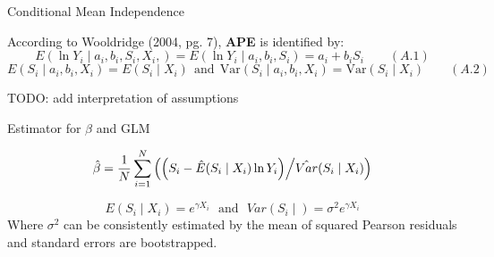 \documentclass[10pt,ignorenonframetext,]{beamer}
\begin{document}
\begin{frame}{Conditional Mean Independence}
\protect\hypertarget{conditional-mean-independence}{}

According to Wooldridge (2004, pg. 7), \textbf{APE} is identified by:
\[E (\ln Y_i \mid a_i, b_i, S_i, X_i,) = E (\ln Y_i \mid a_i, b_i, S_i) = a_i+b_i S_i \qquad (A.1)\]
\[E(S_i \mid a_i, b_i, X_i) = E(S_i \mid X_i) ~~\text{and}~~ \mathrm{Var}(S_i \mid 
a_i, b_i, X_i) = \mathrm{Var} (S_i \mid X_i) \qquad (A.2)\]

TODO: add interpretation of assumptions

\end{frame}

\begin{frame}{Estimator for \(\beta\) and GLM}
\protect\hypertarget{estimator-for-beta-and-glm}{}

\[\hat \beta = \frac{1}{N} \sum_{i=1}^N \left( \left( S_i - \hat E (S_i \mid X_i) \ln Y_i \right) \middle/
\hat{Var}(S_i \mid X_i)\right)\]

\[E(S_i \mid X_i ) = e^{\gamma X_i}  ~~~\text{and}~~~ Var(S_i \mid ) = \sigma^2e^{\gamma X_i}\]
Where \(\sigma^2\) can be consistently estimated by the mean of squared
Pearson residuals and standard errors are bootstrapped.

\end{frame}
\end{document}

